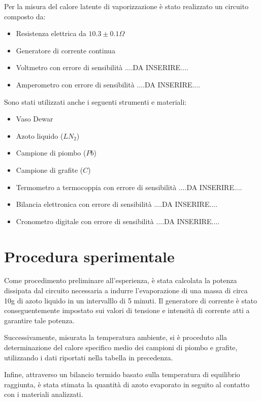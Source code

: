 \documentclass[a4paper,12pt]{article}
\begin{document}
Per la misura del calore latente di vaporizzazione è stato realizzato un circuito composto da:
\begin{itemize}
    \item Resistenza elettrica da $10.3 \pm 0.1 \Omega$
    \item Generatore di corrente continua
    \item Voltmetro con errore di sensibilità ....DA INSERIRE....
    \item Amperometro con errore di sensibilità ....DA INSERIRE....
\end{itemize}

Sono stati utilizzati anche i seguenti strumenti e materiali:
\begin{itemize}
    \item Vaso Dewar
    \item Azoto liquido ($LN_2$)
    \item Campione di piombo ($Pb$)
    \item Campione di grafite ($C$)
    \item Termometro a termocoppia con errore di sensibilità ....DA INSERIRE....
    \item Bilancia elettronica con errore di sensibilità ....DA INSERIRE....
    \item Cronometro digitale con errore di sensibilità ....DA INSERIRE....
\end{itemize}




\section{Procedura sperimentale}

Come procedimento preliminare all'esperienza, è stata calcolata la potenza dissipata dal circuito necessaria
a indurre l'evaporazione di una massa di circa 10g di azoto liquido in un intervalllo di 5 minuti.
Il generatore di corrente è stato conseguentemente impostato sui valori di tensione e intensità di
corrente atti a garantire tale potenza.

Successivamente, misurata la temperatura ambiente, si è proceduto alla determinazione del calore 
specifico medio dei campioni di piombo e grafite, utilizzando i dati riportati nella tabella in
precedenza.

Infine, attraverso un bilancio termido basato sulla temperatura di equilibrio raggiunta, è stata
stimata la quantità di azoto evaporato in seguito al contatto con i materiali analizzati.
\end{document}
